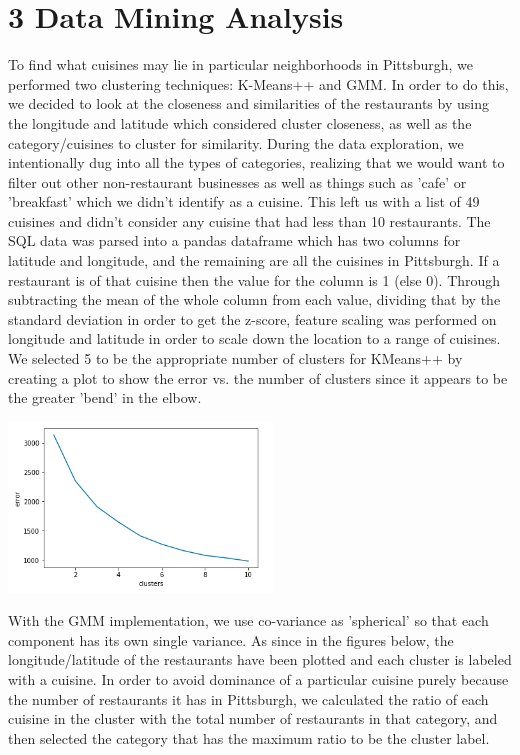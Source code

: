 \documentclass{neu_handout}
\begin{document}
\section*{3 Data Mining Analysis}

To find what cuisines may lie in particular neighborhoods in Pittsburgh, we performed two clustering techniques: K-Means++ and GMM. In order to do this, we decided to look at the closeness and similarities of the restaurants by using the longitude and latitude which considered cluster closeness, as well as the category/cuisines to cluster for similarity. During the data exploration, we intentionally dug into all the types of categories, realizing that we would want to filter out other non-restaurant businesses as well as things such as 'cafe' or 'breakfast' which we didn't identify as a cuisine. This left us with a list of 49 cuisines and didn't consider any cuisine that had less than 10 restaurants. The SQL data was parsed into a pandas dataframe which has two columns for latitude and longitude, and the remaining are all the cuisines in Pittsburgh. If a restaurant is of that cuisine then the value for the column is 1 (else 0). Through subtracting the mean of the whole column from each value, dividing that by the standard deviation in order to get the z-score, feature scaling was performed on longitude and latitude in order to scale down the location to a range of cuisines. We selected 5 to be the appropriate number of clusters for KMeans++ by creating a plot to show the error vs. the number of clusters since it appears to be the greater 'bend' in the elbow. 

\begin{center}
\includegraphics[width=70mm,scale=0.5]{kmeanserror}
\end{center}

With the GMM implementation, we use co-variance as 'spherical' so that each component has its own single variance. As since in the figures below, the longitude/latitude of the restaurants have been plotted and each cluster is labeled with a cuisine. In order to avoid dominance of a particular cuisine purely because the number of restaurants it has in Pittsburgh, we calculated the ratio of each cuisine in the cluster with the total number of restaurants in that category, and then selected the category that has the maximum ratio to be the cluster label.
\end{document}

